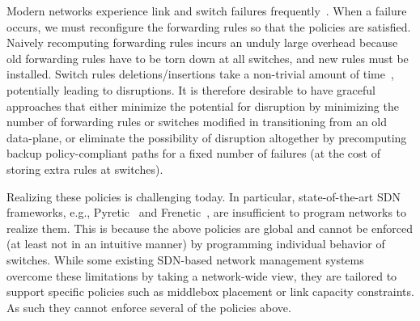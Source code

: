  
 Modern
   networks experience link and switch failures frequently~\cite{datacenterfailures}.
   When a failure occurs, we must reconfigure the forwarding rules
   so that the policies are satisfied. Naively recomputing
   forwarding rules incurs an unduly large overhead because old
   forwarding rules have to be torn down at all switches, and new
   rules must be installed. Switch rules deletions/insertions take a
   non-trivial amount of time~\cite{sdnlatency}, potentially
   leading to disruptions. It is therefore desirable to have graceful
   approaches that either minimize the potential for disruption by
   minimizing the number of forwarding rules or switches modified in
   transitioning from an old data-plane, or eliminate the possibility
   of disruption altogether by precomputing backup policy-compliant
   paths for a fixed number of failures (at the cost of storing extra
   rules at switches).
   


 Realizing these policies  is challenging today.
In particular, state-of-the-art SDN frameworks, e.g., Pyretic~\cite{pyretic}
and Frenetic~\cite{frenetic}, are insufficient to program networks to realize
them.  This is because the above policies are global and
cannot be enforced (at least not in an intuitive manner) by
programming individual behavior of switches.  While some existing
SDN-based network management systems~\cite{simple,merlin,oneswitch}
overcome these limitations by taking a network-wide view, they are
tailored to support specific policies such as middlebox placement or
link capacity constraints. As such they cannot enforce several of the
policies above.



